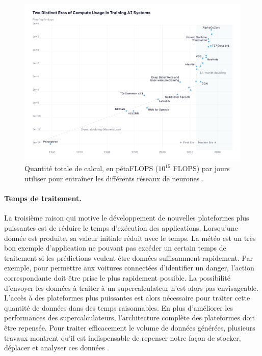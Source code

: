             \begin{figure}
            \center
            \includegraphics[width=14cm]{images/edl_ai_compute.png}
            \caption{\label{fig_edl_ai_compute} Quantité totale de calcul, en pétaFLOPS ($10^{15}$ \gls{FLOPS}) par jours utiliser pour entraîner les différents réseaux de neurones \cite{amodei2ai}.}
            \end{figure}

        \paragraph{Temps de traitement.} 
        
            La troisième raison qui motive le développement de nouvelles plateformes plus puissantes est de réduire le temps d'exécution des applications. Lorsqu'une donnée est produite, sa valeur initiale réduit avec le temps. La météo est un très bon exemple d'application ne pouvant pas excéder un certain temps de traitement si les prédictions veulent être données suffisamment rapidement. Par exemple, pour permettre aux voitures connectées d'identifier un danger, l'action correspondante doit être prise le plus rapidement possible. La possibilité d'envoyer les données à traiter à un supercalculateur n'est alors pas envisageable. L'accès à des plateformes plus puissantes est alors nécessaire pour traiter cette quantité de données dans des temps raisonnables. En plus d'améliorer les performances des supercalculateurs, l'architecture complète des plateformes doit être repensée. Pour traiter efficacement le volume de données générées, plusieurs travaux montrent qu'il est indispensable de repenser notre façon de stocker, déplacer et analyser ces données \cite{Saltz2018, Chen2014, Nahrstedt2017, GeoffreyFoxJhaShantenu2015}.
  
